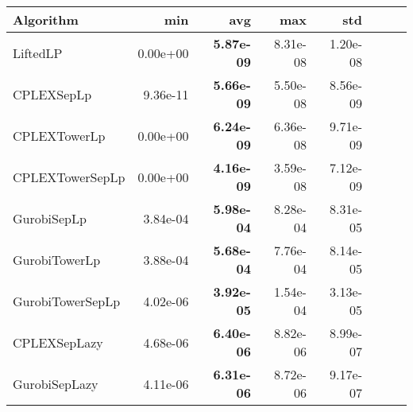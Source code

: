 \begin{tabular}{lrrrrrrr}
Algorithm & min & avg & max & std
\\
\hline
LiftedLP&0.00e+00& \bf5.87e-09& 8.31e-08& 1.20e-08\\
CPLEXSepLp&9.36e-11& \bf5.66e-09& 5.50e-08& 8.56e-09\\
CPLEXTowerLp&0.00e+00& \bf6.24e-09& 6.36e-08& 9.71e-09\\
CPLEXTowerSepLp&0.00e+00& \bf4.16e-09& 3.59e-08& 7.12e-09\\
GurobiSepLp&3.84e-04& \bf5.98e-04& 8.28e-04& 8.31e-05\\
GurobiTowerLp&3.88e-04& \bf5.68e-04& 7.76e-04& 8.14e-05\\
GurobiTowerSepLp&4.02e-06& \bf3.92e-05& 1.54e-04& 3.13e-05\\
CPLEXSepLazy&4.68e-06& \bf6.40e-06& 8.82e-06& 8.99e-07\\
GurobiSepLazy&4.11e-06& \bf6.31e-06& 8.72e-06& 9.17e-07
\end{tabular}
